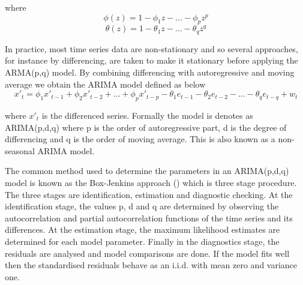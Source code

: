where
        \begin{equation}
            \phi(z) = 1 - \phi_{1}z - ... - \phi_{p}z^{p}
        \end{equation}
        \begin{equation}
            \theta(z) = 1 - \theta_{1}z - ... - \theta_{q}z^{q}
        \end{equation}

In practice, most time series data are non-stationary and so several approaches, for instance
by differencing, are taken to make it stationary before applying the ARMA(p,q) model. By
combining differencing with autoregressive and moving average we obtain the ARIMA model defined
as below
        \begin{equation} \label{eq:arima}
          x'_{t} = \phi_{1}x'_{t-1} + \phi_{2}x'_{t-2} + ... + \phi_{p}x'_{t-p} -
          \theta_{1}e_{t-1} - \theta_{2}e_{t-2} - ... - \theta_{q}e_{t-q} + w_{t}
        \end{equation}

where $x'_{t}$ is the differenced series. Formally the model is denotes as ARIMA(p,d,q) where p
is the order of autoregressive part, d is the degree of differencing and q is the order of moving
average. This is also known as a non-seasonal ARIMA model.

The common method used to determine the parameters in an ARIMA(p,d,q) model is known as the
Box-Jenkins approach (\citet{box2015time}) which is three stage procedure. The three stages are
identification, estimation and diagnostic checking. At the identification stage, the values p, d
and q are determined by observing the autocorrelation and partial autocorrelation functions of
the time series and its differences. At the estimation stage, the maximum likelihood estimates are
determined for each model parameter. Finally in the diagnostics stage, the residuals are analysed
and model comparisons are done. If the model fits well then the standardised residuals behave as
an i.i.d. with mean zero and variance one.

